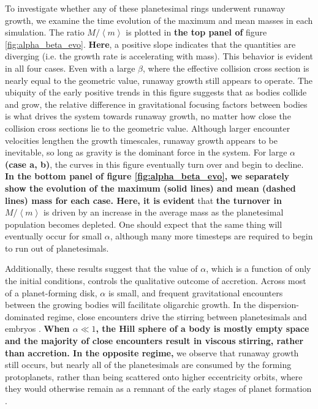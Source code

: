 \documentclass[twocolumn,linenumbers]{aastex63}
\begin{document}
To investigate whether any of these planetesimal rings underwent
runaway growth, we examine the time evolution of the maximum and mean
masses in each simulation. The ratio $M/\left< m \right>$ is plotted
in \textbf{the top panel of} figure \ref{fig:alpha_beta_evo}. \textbf{Here}, a positive slope
indicates that the quantities are diverging (i.e.
the growth rate is accelerating with mass). This behavior is
evident in all four cases. Even with a large
$\beta$, where the effective collision cross section is
 nearly equal to the geometric value, runaway growth still appears to
operate. The ubiquity of the early positive trends in this figure suggests
that as bodies collide and grow, the
relative difference in gravitational focusing factors between bodies
is what drives the system towards runaway
growth, no matter how close the collision cross sections lie to the geometric value.
Although larger encounter velocities lengthen the growth
timescales, runaway growth appears to be inevitable, so long as
gravity is the dominant force in the system. For large $\alpha$
\textbf{(case a, b)}, the curves in this figure eventually turn over and begin to decline.
\textbf{In the bottom panel of figure \ref{fig:alpha_beta_evo}, we separately show the evolution of
the maximum (solid lines) and mean (dashed lines) mass for each case. Here, it is evident}
that \textbf{the turnover in $M/\left< m \right>$} is
driven by an increase in the average mass as the planetesimal population
becomes depleted. One should expect that the same thing will eventually
occur for small $\alpha$, although many more timesteps are required to
begin to run out of planetesimals.

Additionally, these results suggest that the value of $\alpha$, which is a function of only the initial conditions, controls the qualitative outcome of accretion. 
Across most of a planet-forming disk, $\alpha$ is small, and frequent gravitational encounters between the growing bodies will 
facilitate oligarchic growth. In the dispersion-dominated regime, close encounters drive the stirring between planetesimals and 
embryos \citep{weidenschilling89, ida90}. \textbf{When $\alpha \ll 1$, the Hill sphere of a body is mostly empty space and the majority of close encounters result in viscous stirring, rather than accretion. In the opposite regime,} we 
observe that runaway growth still occurs, but nearly all of the planetesimals are consumed by the forming protoplanets, rather 
than being scattered onto higher eccentricity orbits, where they would otherwise remain as a remnant of the early stages of 
planet formation \citep{kokubo98, kokubo00}.
\end{document}
